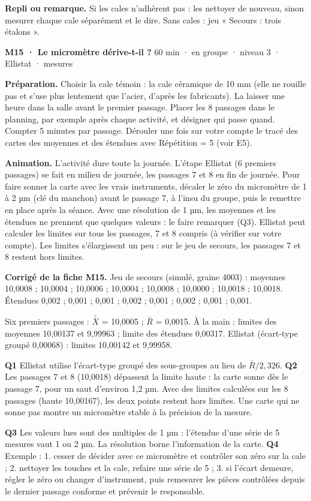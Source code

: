 {\small\textbf{Repli ou remarque.} Si les cales n'adhèrent pas : les nettoyer de nouveau, sinon mesurer chaque cale séparément et le dire. Sans cales : jeu « Secours : trois étalons ».}\par
\vspace{3pt}
\begin{tcolorbox}[act]\textbf{M15 · Le micromètre dérive-t-il ?} \hfill {\small 60 min · en groupe · niveau 3 · Ellistat · mesures}\end{tcolorbox}
\textbf{Préparation.} Choisir la cale témoin : la cale céramique de 10 mm (elle ne rouille pas et s'use plus lentement que l'acier, d'après les fabricants). La laisser une heure dans la salle avant le premier passage. Placer les 8 passages dans le planning, par exemple après chaque activité, et désigner qui passe quand. Compter 5 minutes par passage. Dérouler une fois sur votre compte le tracé des cartes des moyennes et des étendues avec Répétition = 5 (voir E5).\par
\textbf{Animation.} L'activité dure toute la journée. L'étape Ellistat (6 premiers passages) se fait en milieu de journée, les passages 7 et 8 en fin de journée. Pour faire sonner la carte avec les vrais instruments, décaler le zéro du micromètre de 1 à 2 µm (clé du manchon) avant le passage 7, à l'insu du groupe, puis le remettre en place après la séance. Avec une résolution de 1 µm, les moyennes et les étendues ne prennent que quelques valeurs : le faire remarquer (Q3). Ellistat peut calculer les limites sur tous les passages, 7 et 8 compris (à vérifier sur votre compte). Les limites s'élargissent un peu : sur le jeu de secours, les passages 7 et 8 restent hors limites.\par
\textbf{\color{ok}Corrigé de la fiche M15.} Jeu de secours (simulé, graine 4003) : moyennes 10,0008 ; 10,0004 ; 10,0006 ; 10,0004 ; 10,0008 ; 10,0000 ; 10,0018 ; 10,0018. Étendues 0,002 ; 0,001 ; 0,001 ; 0,002 ; 0,001 ; 0,002 ; 0,001 ; 0,001.\par Six premiers passages : $\bar{\bar X}$ = 10,0005 ; $\bar R$ = 0,0015. À la main : limites des moyennes 10,00137 et 9,99963 ; limite des étendues 0,00317. Ellistat (écart-type groupé 0,00068) : limites 10,00142 et 9,99958.\par \textbf{Q1} Ellistat utilise l'écart-type groupé des sous-groupes au lieu de $\bar R / 2{,}326$. \textbf{Q2} Les passages 7 et 8 (10,0018) dépassent la limite haute : la carte sonne dès le passage 7, pour un saut d'environ 1,2 µm. Avec des limites calculées sur les 8 passages (haute 10,00167), les deux points restent hors limites. Une carte qui ne sonne pas montre un micromètre stable à la précision de la mesure.\par \textbf{Q3} Les valeurs lues sont des multiples de 1 µm : l'étendue d'une série de 5 mesures vaut 1 ou 2 µm. La résolution borne l'information de la carte. \textbf{Q4} Exemple : 1. cesser de décider avec ce micromètre et contrôler son zéro sur la cale ; 2. nettoyer les touches et la cale, refaire une série de 5 ; 3. si l'écart demeure, régler le zéro ou changer d'instrument, puis remesurer les pièces contrôlées depuis le dernier passage conforme et prévenir le responsable.\par
